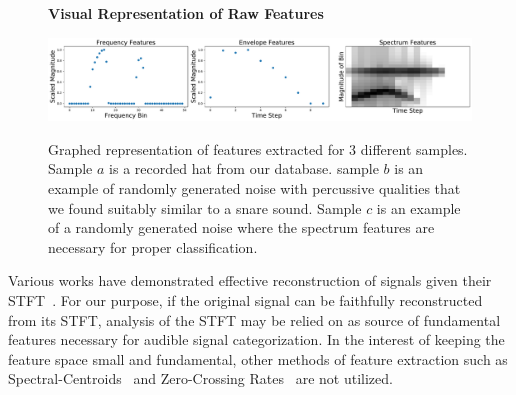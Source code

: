 \documentclass[\main/thesis.tex]{subfiles}
\begin{document}
\begin{figure}
\centering
\textbf{Visual Representation of Raw Features}\par\medskip
    { \includegraphics[width=1\columnwidth]{images/ff3.pdf}}
\caption{Graphed representation of features extracted for 3 different samples. Sample $a$ is a recorded hat from our database. sample $b$ is an example of randomly generated noise with percussive qualities that we found suitably similar to a snare sound. Sample $c$ is an example of a randomly generated noise where the spectrum features are necessary for proper classification.}
\label{fig:stackspectrums}
\end{figure}
Various works have demonstrated effective reconstruction of signals given their STFT~\cite{nawab1983signal,griffin1984signal}. For our purpose, if the original signal can be faithfully reconstructed from its STFT, analysis of the STFT may be relied on as source of fundamental features necessary for audible signal categorization. In the interest of keeping the feature space small and fundamental, other methods of feature extraction such as Spectral-Centroids~\cite{schubert2004spectral} and Zero-Crossing Rates~\cite{gouyon2000use} are not utilized.
\end{document}
